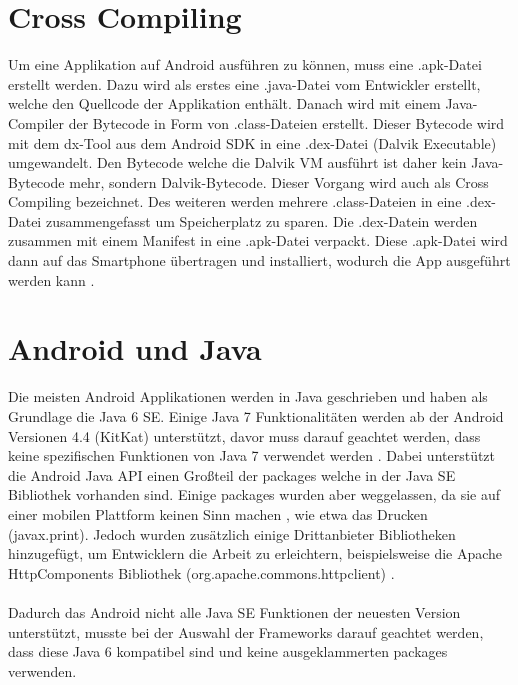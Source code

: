 \section{Cross Compiling}
Um eine Applikation auf Android ausführen zu können, muss eine .apk-Datei erstellt werden. Dazu wird als erstes eine .java-Datei vom Entwickler erstellt, welche den Quellcode der Applikation enthält. Danach wird mit einem Java-Compiler der Bytecode in Form von .class-Dateien erstellt. Dieser Bytecode wird mit dem dx-Tool aus dem Android SDK in eine .dex-Datei (Dalvik Executable) umgewandelt. Den Bytecode welche die Dalvik VM ausführt ist daher kein Java-Bytecode mehr, sondern Dalvik-Bytecode. Dieser Vorgang wird auch als Cross Compiling bezeichnet. Des weiteren werden mehrere .class-Dateien in eine .dex-Datei zusammengefasst um Speicherplatz zu sparen. Die .dex-Datein werden zusammen mit einem Manifest in eine .apk-Datei verpackt. Diese .apk-Datei wird dann auf das Smartphone übertragen und installiert, wodurch die App ausgeführt werden kann \cite{unterschied:dirscherl}.	

\section{Android und Java}
Die meisten Android Applikationen werden in Java geschrieben und haben als Grundlage die Java 6 \acrfull{SE}. Einige Java 7 Funktionalitäten werden ab der Android Versionen 4.4 (KitKat) unterstützt, davor muss darauf geachtet werden, dass keine spezifischen Funktionen von Java 7 verwendet werden \cite{android:burnette}. Dabei unterstützt die Android Java \acrfull{API} einen Großteil der packages welche in der Java SE Bibliothek vorhanden sind. Einige packages wurden aber weggelassen, da sie auf einer mobilen Plattform keinen Sinn machen \cite{implemenationSDK}, wie etwa das Drucken (javax.print). Jedoch wurden zusätzlich einige Drittanbieter Bibliotheken hinzugefügt, um Entwicklern die Arbeit zu erleichtern, beispielsweise die Apache HttpComponents Bibliothek (org.apache.commons.httpclient) \cite{android:libs}. 
\\\\	
Dadurch das Android nicht alle Java SE Funktionen der neuesten Version unterstützt, musste bei der Auswahl der Frameworks darauf geachtet werden, dass diese Java 6 kompatibel sind und keine ausgeklammerten packages verwenden.	

